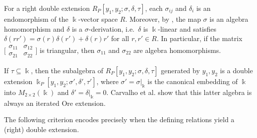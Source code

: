 \documentclass{amsart}
\theoremstyle{definition}
\theoremstyle{remark}
\numberwithin{equation}{section}
\begin{document}
For a right double extension $R_P[y_1,y_2;\sigma,\delta,\tau]$, each $\sigma_{ij}$ and $\delta_i$ is an endomorphism of the $\Bbbk$-vector space $R$.
Moreover, by \cite[Lemma 1.7]{ZhangZhang2008}, the map $\sigma$ is an algebra homomorphism and $\delta$ is a $\sigma$-derivation, i.e.\ $\delta$ is $\Bbbk$-linear and satisfies
$\delta(rr')=\sigma(r)\delta(r')+\delta(r)r'$ for all $r,r'\in R$.
In particular, if the matrix $\bigl[\begin{smallmatrix}\sigma_{11}&\sigma_{12}\\ \sigma_{21}&\sigma_{22}\end{smallmatrix}\bigr]$ is triangular, then $\sigma_{11}$ and $\sigma_{22}$ are algebra homomorphisms.

If $\tau\subseteq \Bbbk$, then the subalgebra of $R_P[y_1,y_2;\sigma,\delta,\tau]$ generated by $y_1,y_2$ is a double extension
$\Bbbk_P[y_1,y_2;\sigma',\delta',\tau']$, where $\sigma'=\sigma|_{\Bbbk}$ is the canonical embedding of $\Bbbk$ into $M_{2\times 2}(\Bbbk)$ and $\delta'=\delta|_{\Bbbk}=0$.
Carvalho et al. \cite[Proposition 1.2]{Carvalhoetal2011} show that this latter algebra is always an iterated Ore extension.

The following criterion encodes precisely when the defining relations yield a (right) double extension.
\end{document}

